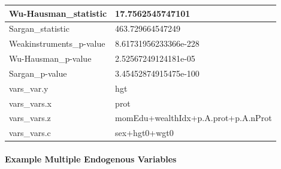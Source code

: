 \documentclass[
]{book}
\newenvironment{Shaded}{\begin{snugshade}}{\end{snugshade}}
\newcommand{\CommentTok}[1]{\textcolor[rgb]{0.56,0.35,0.01}{\textit{#1}}}
\newcommand{\DataTypeTok}[1]{\textcolor[rgb]{0.13,0.29,0.53}{#1}}
\newcommand{\KeywordTok}[1]{\textcolor[rgb]{0.13,0.29,0.53}{\textbf{#1}}}
\newcommand{\NormalTok}[1]{#1}
\newcommand{\OperatorTok}[1]{\textcolor[rgb]{0.81,0.36,0.00}{\textbf{#1}}}
\newcommand{\OtherTok}[1]{\textcolor[rgb]{0.56,0.35,0.01}{#1}}
\newcommand{\StringTok}[1]{\textcolor[rgb]{0.31,0.60,0.02}{#1}}
\begin{document}
\begin{table}[!h]
\begin{tabular}{l|l}
\hline
\rowcolor{gray!6}  Wu-Hausman\_statistic & 17.7562545747101\\
\hline
Sargan\_statistic & 463.729664547249\\
\hline
\rowcolor{gray!6}  Weakinstruments\_p-value & 8.61731956233366e-228\\
\hline
Wu-Hausman\_p-value & 2.52567249124181e-05\\
\hline
\rowcolor{gray!6}  Sargan\_p-value & 3.45452874915475e-100\\
\hline
vars\_var.y & hgt\\
\hline
\rowcolor{gray!6}  vars\_vars.x & prot\\
\hline
vars\_vars.z & momEdu+wealthIdx+p.A.prot+p.A.nProt\\
\hline
\rowcolor{gray!6}  vars\_vars.c & sex+hgt0+wgt0\\
\hline
\end{tabular}
\end{table}

\hypertarget{example-multiple-endogenous-variables}{%
\paragraph{Example Multiple Endogenous Variables}\label{example-multiple-endogenous-variables}}

\begin{Shaded}
\end{Shaded}
\end{document}
